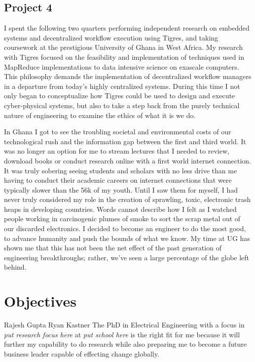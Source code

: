 \documentclass[journal, draftcls]{IEEEtran}
\begin{document}
\subsection{Project 4}
 I spent the following two quarters performing independent research on embedded systems and decentralized workflow execution using Tigres, and taking coursework at the prestigious University of Ghana in West Africa. My research with Tigres  focused on the feasibility and implementation of techniques used in MapReduce implementations to data intensive science on exascale computers. This philosophy demands the implementation of decentralized workflow managers in a departure from today's highly centralized systems. During this time I not only began to conceptualize how Tigres could be used to design and execute cyber-physical systems, but also to take a step back from the purely technical nature of engineering to examine the ethics of what it is we do. 
 
 In Ghana I got to see the troubling societal and environmental costs of our technological rush and the information gap between the first and third world. It was no longer an option for me to stream lectures that I needed to review, download books or conduct research online with a first world internet connection. It was truly sobering seeing students and scholars with no less drive than me having to conduct their academic careers on internet connections that were typically slower than the 56k of my youth. Until I saw them for myself, I had never truly considered my role in the creation of sprawling, toxic, electronic trash heaps in developing countries. Words cannot describe how I felt as I watched people working in carcinogenic plumes of smoke to sort the scrap metal out of our discarded electronics. I decided to become an engineer to do the most good, to advance humanity and push the bounds of what we know. My time at UG has shown me that this has not been the net effect of the past generation of engineering breakthroughs; rather, we've seen a large percentage of the globe left behind. 

\section{Objectives}
Rajesh Gupta 
Ryan Kastner
The PhD in Electrical Engineering with a focus in \textit{{put research focus here}} at \textit{{put school here}} is the right fit for me because it will further my capability to do research while also preparing me to become a future business leader capable of effecting change globally. 
\end{document}
